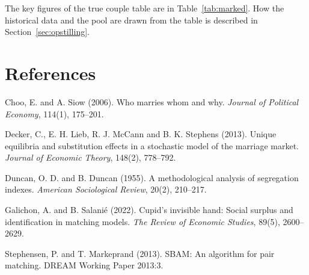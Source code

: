 \documentclass[12pt,a4paper]{article}
\begin{document}
The key figures of the true couple table are in Table~\ref{tab:marked}. How the historical data and
the pool are drawn from the table is described in Section~\ref{sec:opstilling}.


\section*{References}

\small
\begin{description}[leftmargin=1.5em, itemsep=0pt, font=\normalfont]
\item Choo, E. and A. Siow (2006). Who marries whom and why. \emph{Journal of Political Economy},
114(1), 175--201.
\item Decker, C., E. H. Lieb, R. J. McCann and B. K. Stephens (2013). Unique equilibria and
substitution effects in a stochastic model of the marriage market. \emph{Journal of Economic
Theory}, 148(2), 778--792.
\item Duncan, O. D. and B. Duncan (1955). A methodological analysis of segregation indexes.
\emph{American Sociological Review}, 20(2), 210--217.
\item Galichon, A. and B. Salanié (2022). Cupid's invisible hand: Social surplus and identification
in matching models. \emph{The Review of Economic Studies}, 89(5), 2600--2629.
\item Stephensen, P. and T. Markeprand (2013). SBAM: An algorithm for pair matching. DREAM Working
Paper 2013:3.
\end{description}
\end{document}
